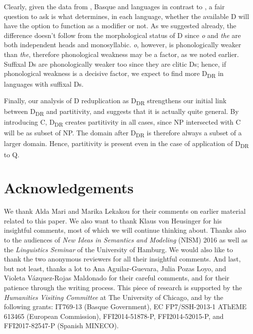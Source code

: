 \documentclass[output=paper,
modfonts
]{langscibook}
\begin{document}
Clearly, given the data from , Basque and  languages in contrast to , a fair question to ask is what determines, in each language, whether the available D will have the option to function as a modifier or not. As we suggested already, the difference doesn't follow  from  the morphological status of D since  \textit{o} and  \textit{the} are both independent heads and monosyllabic.  \textit{o}, however, is phonologically weaker than \textit{the}, therefore phonological weakness may be a factor, as we noted earlier. Suffixal Ds are phonologically weaker too since they are clitic Ds; hence, if phonological weakness is a decisive factor, we expect to find more D\textsubscript{DR} in languages with suffixal Ds. 

Finally, our analysis of D reduplication as D\textsubscript{DR} strengthens our initial link between D\textsubscript{DR} and partitivity, and suggests that it is actually quite general. By introducing C, D\textsubscript{DR} creates partitivity in all cases, since NP intersected with C will be as subset of NP. The domain after D\textsubscript{DR} is therefore always a subset of a larger domain. Hence, partitivity is present even in the case of application of D\textsubscript{DR} to Q. 


\section*{Acknowledgements}
We thank Alda Mari and Marika Lekakou for their comments on earlier material related to this paper. We also want to thank Klaus von Heusinger for his insightful comments, most of which we will continue thinking about. Thanks also to the audiences of \textit{New Ideas in Semantics and Modeling} (NISM) 2016 as well as the \textit{Linguistics Seminar} of the University of Hamburg. We would also like to thank the two anonymous reviewers for all their insightful comments. And last, but not least, thanks a lot to Ana Aguilar-Guevara, Julia Pozas Loyo, and Violeta V\'azquez-Rojas Maldonado for their careful comments, and for their patience through the writing process. This piece of research is supported by the \textit{Humanities Visiting Committee} at The University of Chicago, and by the following grants: IT769-13 (Basque Government), EC FP7/SSH-2013-1 AThEME 613465 (European Commission), FFI2014-51878-P, FFI2014-52015-P, and FFI2017-82547-P (Spanish MINECO).


{\sloppy
\printbibliography[heading=subbibliography,notkeyword=this]
}
\end{document}
